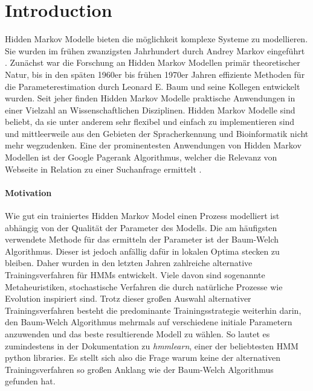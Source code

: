 \chapter{Introduction}  
Hidden Markov Modelle bieten die möglichkeit komplexe Systeme zu modellieren. Sie wurden im frühen zwanzigsten Jahrhundert durch Andrey Markov eingeführt \cite*{rabiner}. Zunächst war die Forschung an Hidden Markov Modellen primär theoretischer Natur, bis in den späten 1960er bis frühen 1970er Jahren effiziente Methoden für die Parameterestimation durch Leonard E. Baum und seine Kollegen entwickelt wurden. Seit jeher finden Hidden Markov Modelle praktische Anwendungen in einer Vielzahl an Wissenschaftlichen Disziplinen. Hidden Markov Modelle sind beliebt, da sie unter anderem sehr flexibel und einfach zu implementieren sind \cite*{HmmReview} und mittleerweile aus den Gebieten der Spracherkennung \cite*{ApplicationSpeechRecognition} und Bioinformatik \cite*{ApplicationComputationalBiology} nicht mehr wegzudenken. Eine der prominentesten Anwendungen von Hidden Markov Modellen ist der Google Pagerank Algorithmus, welcher die Relevanz von Webseite in Relation zu einer Suchanfrage ermittelt \cite*{ApplicationPageRank}.

\subsubsection*{Motivation}
Wie gut ein trainiertes Hidden Markov Model einen Prozess modelliert ist abhängig von der Qualität der Parameter des Modells. Die am häufigsten verwendete Methode für das ermitteln der Parameter ist der Baum-Welch Algorithmus. Dieser ist jedoch anfällig dafür in lokalen Optima stecken zu bleiben. Daher wurden in den letzten Jahren zahlreiche alternative Trainingsverfahren für HMMs entwickelt. Viele davon sind sogenannte Metaheuristiken, stochastische Verfahren die durch natürliche Prozesse wie Evolution inspiriert sind. Trotz dieser großen Auswahl alternativer Trainingsverfahren besteht die predominante Trainingsstrategie weiterhin darin, den Baum-Welch Algorithmus mehrmals auf verschiedene initiale Parametern anzuwenden und das beste resultierende Modell zu wählen. So lautet es zumindestens in der Dokumentation zu \textit{hmmlearn}, einer der beliebtesten HMM python libraries. Es stellt sich also die Frage warum keine der alternativen Trainingsverfahren so großen Anklang wie der Baum-Welch Algorithmus gefunden hat.

